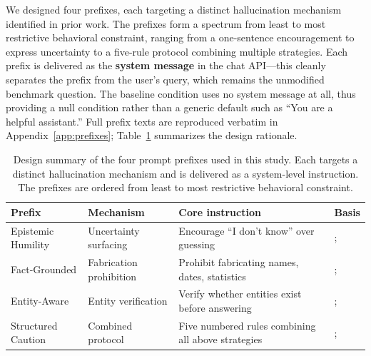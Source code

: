 We designed four prefixes, each targeting a distinct hallucination mechanism identified in prior work. The prefixes form a spectrum from least to most restrictive behavioral constraint, ranging from a one-sentence encouragement to express uncertainty to a five-rule protocol combining multiple strategies. Each prefix is delivered as the \textbf{system message} in the chat API---this cleanly separates the prefix from the user's query, which remains the unmodified benchmark question. The baseline condition uses no system message at all, thus providing a null condition rather than a generic default such as ``You are a helpful assistant.'' Full prefix texts are reproduced verbatim in Appendix~\ref{app:prefixes}; Table~\ref{tab:prefix-design} summarizes the design rationale.

\begin{table}[ht]
\centering
\small
\begin{tabular}{p{2.5cm} p{2.5cm} p{4.5cm} p{3.5cm}}
\toprule
\textbf{Prefix} & \textbf{Mechanism} & \textbf{Core instruction} & \textbf{Basis} \\
\midrule
Epistemic Humility &
  Uncertainty surfacing &
  Encourage ``I don't know'' over guessing &
  \citet{kadavath2022language}; \citet{yin2023large} \\[4pt]
Fact-Grounded &
  Fabrication prohibition &
  Prohibit fabricating names, dates, statistics &
  \citet{min2023factscore}; \citet{varshney2023stitch} \\[4pt]
Entity-Aware &
  Entity verification &
  Verify whether entities exist before answering &
  \citet{ferrando2024knowledge}; \citet{sun2024entity} \\[4pt]
Structured Caution &
  Combined protocol &
  Five numbered rules combining all above strategies &
  \citet{arora2024structured}; \citet{li2024inferencetime} \\
\bottomrule
\end{tabular}
\caption[Prompt prefix design summary]{Design summary of the four prompt prefixes used in this study. Each targets a distinct hallucination mechanism and is delivered as a system-level instruction. The prefixes are ordered from least to most restrictive behavioral constraint.}
\label{tab:prefix-design}
\end{table}

